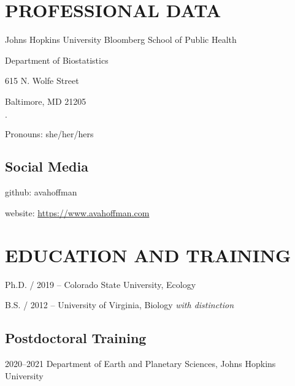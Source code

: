\documentclass{cv}
\begin{document}


\section*{PROFESSIONAL DATA}

Johns Hopkins University Bloomberg School of Public Health

Department of Biostatistics

615 N. Wolfe Street

Baltimore, MD 21205

 $\cdot$ 

Pronouns: she/her/hers

\subsection*{Social Media}

github: avahoffman

website: \href{https://www.avahoffman.com}{https://www.avahoffman.com}


\section*{EDUCATION AND TRAINING}

Ph.D. / 2019 -- Colorado State University, Ecology

B.S. / 2012 -- University of Virginia, Biology \textit{with distinction}

\subsection*{Postdoctoral Training}

2020--2021 Department of Earth and Planetary Sciences,  Johns Hopkins University

\end{document}
